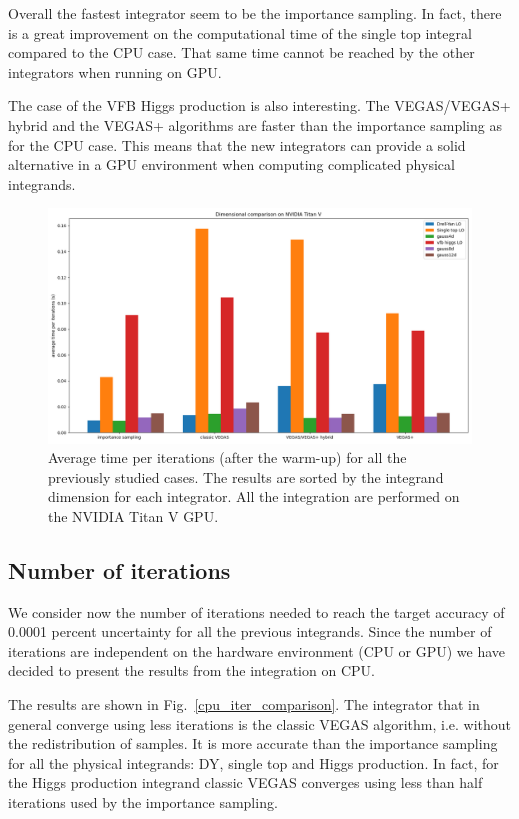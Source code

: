 \documentclass[../main/main.tex]{subfiles}
\begin{document}
Overall the fastest integrator seem to be the importance sampling. In fact, there is a great improvement on the computational time of the single top integral compared to the CPU case. That same time cannot be reached by the other integrators when running on GPU.

The case of the VFB Higgs production is also interesting. The VEGAS/VEGAS+ hybrid and the VEGAS+ algorithms are faster than the importance sampling as for the CPU case. This means that the new integrators can provide a solid alternative in a GPU environment when computing complicated physical integrands.

\begin{figure}[h]
	\centering
	\includegraphics[width=\textwidth]{../images/dim_comparison_GPU.png}
	\caption{Average time per iterations (after the warm-up) for all the previously studied cases. The results are sorted by the integrand dimension for each integrator. All the integration are performed on the NVIDIA Titan V GPU. }
	\label{gpu_time_comparison}
\end{figure}


\subsection{Number of iterations}
We consider now the number of iterations needed to reach the target accuracy of 0.0001 percent uncertainty for all the previous integrands. Since the number of iterations are independent on the hardware environment (CPU or GPU) we have decided to present the results from the integration on CPU. 

The results are shown in Fig.~\ref{cpu_iter_comparison}. The integrator that in general converge
using less iterations is the classic VEGAS algorithm, i.e. without the redistribution of samples. It is more accurate than the importance sampling for all the physical integrands: DY, single top and Higgs production. In fact, for the Higgs production integrand classic VEGAS converges using less than half iterations used by the importance sampling.
\end{document}
